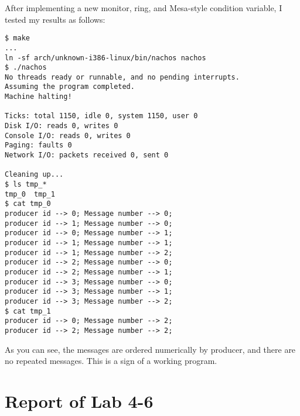 \documentclass[11pt]{article}
\begin{document}
\begin{question}
    After implementing a new monitor, ring, and Mesa-style condition variable, I tested my results as follows:

    \begin{verbatim}
$ make
...
ln -sf arch/unknown-i386-linux/bin/nachos nachos
$ ./nachos
No threads ready or runnable, and no pending interrupts.
Assuming the program completed.
Machine halting!

Ticks: total 1150, idle 0, system 1150, user 0
Disk I/O: reads 0, writes 0
Console I/O: reads 0, writes 0
Paging: faults 0
Network I/O: packets received 0, sent 0

Cleaning up...
$ ls tmp_*
tmp_0  tmp_1
$ cat tmp_0
producer id --> 0; Message number --> 0;
producer id --> 1; Message number --> 0;
producer id --> 0; Message number --> 1;
producer id --> 1; Message number --> 1;
producer id --> 1; Message number --> 2;
producer id --> 2; Message number --> 0;
producer id --> 2; Message number --> 1;
producer id --> 3; Message number --> 0;
producer id --> 3; Message number --> 1;
producer id --> 3; Message number --> 2;
$ cat tmp_1
producer id --> 0; Message number --> 2;
producer id --> 2; Message number --> 2;
    \end{verbatim}

    As you can see, the messages are ordered numerically by producer, and there are no repeated messages. This is a sign of a working program.

\end{question}

\section{Report of Lab 4-6}
\setcounter{qsection}{0}
\end{document}
